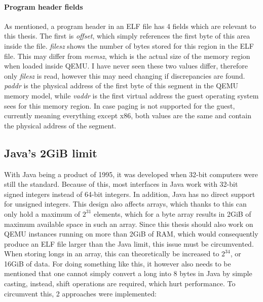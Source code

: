 \paragraph{Program header fields}
As mentioned, a program header in an ELF file has 4 fields which are relevant to this thesis.
The first is \emph{offset}, which simply references the first byte of this area inside the file.
\emph{filesz} shows the number of bytes stored for this region in the ELF file.
This may differ from \emph{memsz}, which is the actual size of the memory region when loaded inside QEMU.
I have never seen these two values differ, therefore only \emph{filesz} is read,
however this may need changing if discrepancies are found.
\emph{paddr} is the physical address of the first byte of this segment in the QEMU memory model,
while \emph{vaddr} is the first virtual address the guest operating system sees for this memory region.
In case paging is not supported for the guest, currently meaning everything except x86,
both values are the same and contain the physical address of the segment.

\subsection{Java's 2GiB limit}\label{sec:Java_2GB}
With Java being a product of 1995, it was developed when 32-bit computers were still the standard.
Because of this, most interfaces in Java work with 32-bit signed integers instead of 64-bit integers.
In addition, Java has no direct support for unsigned integers.
This design also affects arrays, which thanks to this can only hold a maximum of $2^{31}$ elements,
which for a byte array results in 2GiB of maximum available space in such an array.
Since this thesis should also work on QEMU instances running on more than 2GiB of RAM,
which would consequently produce an ELF file larger than the Java limit,
this issue must be circumvented.
When storing longs in an array, this can theoretically be increased to $2^{34}$, or 16GiB of data.
For doing something like this, it however also needs to be mentioned that one cannot simply convert a long into 8 bytes in Java by simple casting,
instead, shift operations are required, which hurt performance.
To circumvent this, 2 approaches were implemented:

